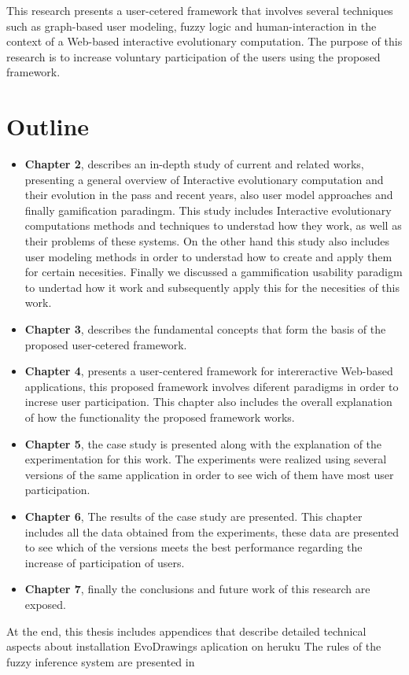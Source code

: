 \par This research presents a user-cetered framework that involves several techniques 
such as graph-based user modeling, fuzzy logic and human-interaction in the context 
of a Web-based interactive evolutionary computation. The purpose of this research 
is to increase voluntary participation of the users  using the proposed framework.

\section{Outline}



\begin{itemize}  
\item \textbf{Chapter 2}, describes an in-depth study
 of current and related works, presenting a general
overview of Interactive evolutionary computation and their evolution in the pass and recent years, also user model approaches and finally gamification paradingm.
This study includes Interactive evolutionary computations methods
and techniques to understad how they work, as well as their problems
of these systems. On the other hand this study also includes user modeling methods in order to understad how to create and apply them for certain necesities. Finally we discussed a gammification usability paradigm to undertad how it work and subsequently apply this
for the necesities of this work.  
\item \textbf{Chapter 3}, describes the fundamental
concepts that form the basis of the proposed user-cetered framework.
\item \textbf{Chapter 4}, presents a user-centered framework for intereractive Web-based
applications, this proposed framework involves diferent paradigms in order to increse
user participation. This chapter also includes the
overall explanation of how the functionality the proposed framework works.
\item \textbf {Chapter 5}, the case study is presented along with the explanation
of the experimentation for this work. The experiments were realized using several versions of
the same application in order to see wich of them have most user participation.
\item \textbf {Chapter 6}, The results of the case study are presented. This chapter includes all the data obtained from the experiments, these data are presented to see which of the versions meets the best performance regarding the increase of participation of users.
\item \textbf {Chapter 7}, finally the conclusions and future work of this research are exposed.
\end{itemize}  
At the end, this thesis includes appendices that describe
detailed technical aspects about installation EvoDrawings aplication on heruku
The rules of the fuzzy inference system are presented in  %
